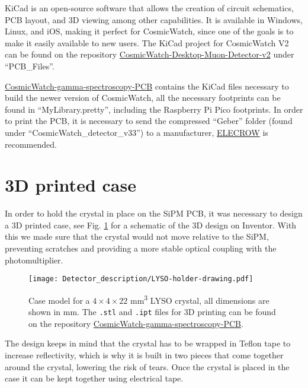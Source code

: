 KiCad is an open-source software that allows the creation of circuit schematics, PCB layout, and 3D viewing among other capabilities. It is available in Windows, Linux, and iOS, making it perfect for CosmicWatch, since one of the goals is to make it easily available to new users. The KiCad project for CosmicWatch V2 can be found on the repository \href{https://github.com/spenceraxani/CosmicWatch-Desktop-Muon-Detector-v2}{CosmicWatch-Desktop-Muon-Detector-v2} under ``PCB\_Files''.

\href{https://github.com/anvargasl/CosmicWatch-gamma-spectroscopy-PCB}{CosmicWatch-gamma-spectroscopy-PCB} contains the KiCad files necessary to build the newer version of CosmicWatch, all the necessary footprints can be found in ``MyLibrary.pretty'', including the Raspberry Pi Pico footprints. In order to print the PCB, it is necessary to send the compressed ``Geber'' folder (found under ``CosmicWatch\_detector\_v33'') to a manufacturer, \href{https://www.elecrow.com/pcb-manufacturing.html}{ELECROW} is recommended.

\section{3D printed case}

In order to hold the crystal in place on the SiPM PCB, it was necessary to design a 3D printed case, see Fig. \ref{fig:3d_case_desing} for a schematic of the 3D design on Inventor. With this we made sure that the crystal would not move relative to the SiPM, preventing scratches and providing a more stable optical coupling with the photomultiplier.

\begin{figure}
    \centering
    \texttt{[image: Detector\_description/LYSO-holder-drawing.pdf]}
    \caption{Case model for a $4\times4\times22$ \unit{mm\cubed} LYSO crystal, all dimensions are shown in \unit{\mm}. The \texttt{.stl} and \texttt{.ipt} files for 3D printing can be found on the repository \href{https://github.com/anvargasl/CosmicWatch-gamma-spectroscopy-PCB}{CosmicWatch-gamma-spectroscopy-PCB}.}
    \label{fig:3d_case_desing}
\end{figure}

The design keeps in mind that the crystal has to be wrapped in Teflon tape to increase reflectivity, which is why it is built in two pieces that come together around the crystal, lowering the risk of tears. Once the crystal is placed in the case it can be kept together using electrical tape.

